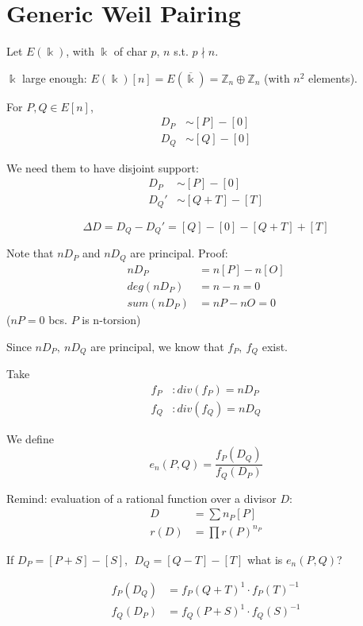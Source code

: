 \documentclass{article}
\theoremstyle{definition}
\begin{document}
\section{Generic Weil Pairing}
Let $E(\Bbbk)$, with $\Bbbk$ of char $p$, $n$ s.t. $p \nmid n$.

$\Bbbk$ large enough: $E(\Bbbk)[n] = E(\overline{\Bbbk}) = \mathbb{Z}_n \oplus \mathbb{Z}_n$ (with $n^2$ elements).

For $P, Q \in E[n]$,
\begin{align*}
  D_P &\sim [P] - [0]\\
  D_Q &\sim [Q] - [0]
\end{align*}

We need them to have disjoint support:
\begin{align*}
  D_P &\sim [P] - [0]\\
  D_Q' &\sim [Q+T] - [T]
\end{align*}

$$\Delta D = D_Q - D_Q' = [Q] - [0] - [Q+T] + [T]$$


Note that $n D_P$ and $n D_Q$ are principal. Proof:
\begin{align*}
  n D_P &= n [P] - n [O]\\
  deg(n D_P) &= n - n = 0\\
  sum(n D_P) &= nP - nO = 0
\end{align*}
($nP = 0$ bcs. $P$ is n-torsion)

Since $n D_P,~ n D_Q$ are principal, we know that $f_P,~ f_Q$ exist.

Take
\begin{align*}
  f_P &: div(f_P) = n D_P\\
  f_Q &: div(f_Q) = n D_Q
\end{align*}

We define
$$
e_n(P, Q) = \frac{f_P(D_Q)}{f_Q(D_P)}
$$

Remind: evaluation of a rational function over a divisor $D$:
\begin{align*}
  D &= \sum n_P [P]\\
  r(D) &= \prod r(P)^{n_P}
\end{align*}

If $D_P = [P+S] - [S],~~ D_Q=[Q-T]-[T]$ what is $e_n(P, Q)$?

\begin{align*}
  f_P(D_Q) &= f_P(Q+T)^1 \cdot f_P(T)^{-1}\\
  f_Q(D_P) &= f_Q(P+S)^1 \cdot f_Q(S)^{-1}
\end{align*}
\end{document}
